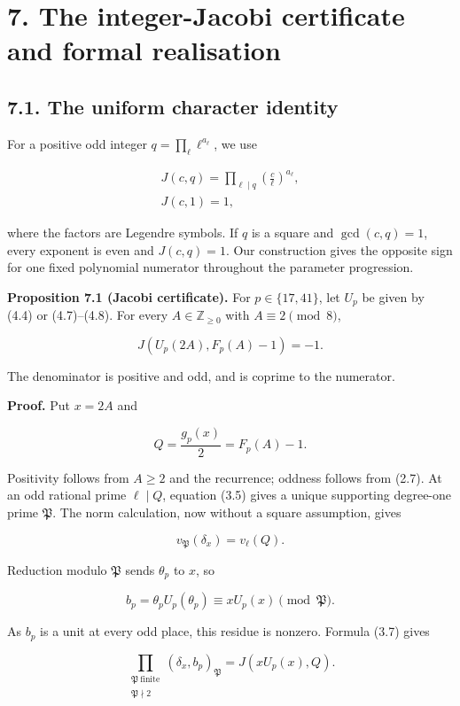 \documentclass[11pt,a4paper]{article}
\begin{document}
\section{7. The integer-Jacobi certificate and formal
realisation}\label{jacobi-formal}

\subsection{7.1. The uniform character identity}\label{jacobi}

For a positive odd integer \(q=\prod_\ell\ell^{a_\ell}\), we use

\[
\begin{gathered}
J(c,q)=\prod_{\ell\mid q}\left(\frac{c}{\ell}\right)^{a_\ell},\\
J(c,1)=1,
\end{gathered}
\]

where the factors are Legendre symbols. If \(q\) is a square and
\(\gcd(c,q)=1\), every exponent is even and \(J(c,q)=1\). Our
construction gives the opposite sign for one fixed polynomial numerator
throughout the parameter progression.

\protect{}\label{prop-jacobi}
\textbf{Proposition 7.1 (Jacobi certificate).} For \(p\in\{17,41\}\),
let \(U_p\) be given by (4.4) or (4.7)--(4.8). For every
\(A\in\mathbb Z_{\ge0}\) with \(A\equiv2\pmod8\),

\[
J\!\left(U_p(2A),F_p(A)-1\right)=-1.
\tag{7.1}
\]

The denominator is positive and odd, and is coprime to the numerator.

\textbf{Proof.} Put \(x=2A\) and

\[
Q=\frac{g_p(x)}2=F_p(A)-1.
\tag{7.2}
\]

Positivity follows from \(A\ge2\) and the recurrence; oddness follows
from (2.7). At an odd rational prime \(\ell\mid Q\), equation (3.5)
gives a unique supporting degree-one prime \(\mathfrak P\). The norm
calculation, now without a square assumption, gives

\[
v_{\mathfrak P}(\delta_x)=v_\ell(Q).
\]

Reduction modulo \(\mathfrak P\) sends \(\theta_p\) to \(x\), so

\[
b_p=\theta_pU_p(\theta_p)
\equiv xU_p(x)\pmod{\mathfrak P}.
\]

As \(b_p\) is a unit at every odd place, this residue is nonzero.
Formula (3.7) gives

\[
\prod_{\substack{\mathfrak P\ \mathrm{finite}\\\mathfrak P\nmid2}}
(\delta_x,b_p)_{\mathfrak P}
=J(xU_p(x),Q).
\tag{7.3}
\]
\end{document}
